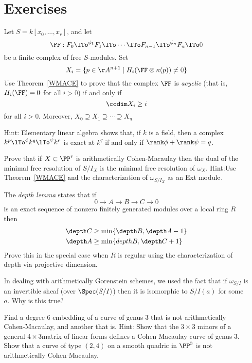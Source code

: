 \section{Exercises}

\begin{exercise}\label{WMACE corollary}
 Let $S = k[x_0,\dots, x_r]$, and let
 $$ 
\FF:  F_0\lTo^{\phi_1}F_1 \lTo \cdots \lTo F_{n-1}\lTo^{\phi_n} F_n\lTo 0
 $$
be a finite complex of free $S$-modules. Set
$$
X_i = \{p\in \AA^{n+1} \mid  H_i(\FF \otimes \kappa(p)) \neq 0\}
$$
Use Theorem~\ref{WMACE} to prove that the complex $\FF$ is \emph{acyclic} (that is, $H_i(\FF) = 0$ for all $i>0$) if and only if
$$
\codim X_i \geq i
$$
for all $i>0$. Moreover, $X_{0}\supseteq X_{1}\supseteq \cdots \supseteq X_{n}$

Hint: Elementary linear algebra shows that, if $k$ is a field, then a complex $k^p \lTo^{\phi} k^q \lTo^\psi k^r$ is exact at $k^q$ if and
only if $\rank \phi +\rank \psi = q$. 
\end{exercise}

\begin{exercise}
Prove that if $X\subset \PP^r$ is arithmetically Cohen-Macaulay then the dual of the minimal free resolution of $S/I_X$
is the minimal free resolution of $\omega_X$. Hint:Use Theorem~\ref{WMACE} and the characterization of $\omega_{S/I_X}$
as an Ext module.
\end{exercise}

\begin{exercise}
The \emph{depth lemma} states that if 
$$
0\to A\to B\to C \to 0
$$
is an exact sequence of nonzero finitely generated modules over a local ring $R$ then
$$
\begin{aligned}
 \depth C &\geq \min\{\depth B, \depth A-1\}\\
 \depth A & \geq \min\{depth B, \depth C +1\}
 \end{aligned}
 $$
Prove this in the special case when $R$ is regular using the characterization of depth
 via projective dimension.
\end{exercise}

\begin{exercise}
In dealing with arithmetically Gorenstein schemes, we used the fact that if $\omega_{S/I}$ is an invertible
sheaf (over $\Spec(S/I)$) then it is isomorphic to $S/I(a)$ for some $a$. Why is this true?
\end{exercise}

\begin{exercise}
Find a degree 6 embedding of a curve of genus 3 that is not arithmetically Cohen-Macaulay, and another that is.
Hint: Show that the $3\times 3$ minors of a general $4\times 3$matrix of linear forms defines a Cohen-Macaulay curve
of genus 3. Show that a curve of type $(2,4)$ on a smooth quadric in $\PP^3$ is not arithmetically Cohen-Macaulay.
\end{exercise}

